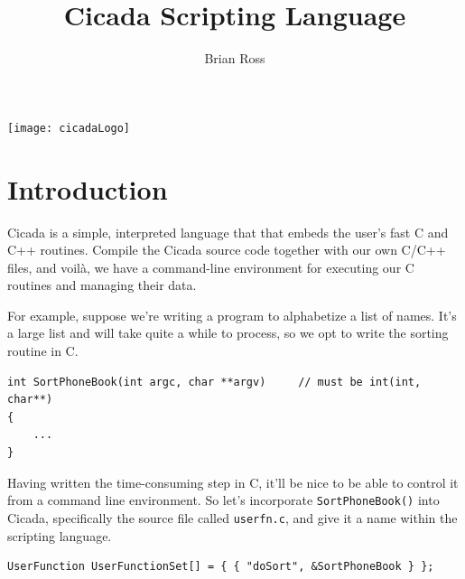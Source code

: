 \documentclass{article}
\title{Cicada Scripting Language}
\author{Brian Ross}
\newenvironment{code}{
       \begin{list}{}{
               \setlength{\leftmargin}{.4in}
               \setlength{\rightmargin}{0in}
               \setlength{\topsep}{.2in}
       }
       \small
       \item[] }
       { \end{list}   }
\begin{document}
\maketitle
\vspace{.5in}
\begin{centering}
\texttt{[image: cicadaLogo]}\\
\end{centering}
\vspace{.5in}
\tableofcontents
\vspace{1.5in}
\newpage





\section{Introduction}

Cicada is a simple, interpreted language that that embeds the user's fast C and C++ routines.  Compile the Cicada source code together with our own C/C++ files, and voil\`a, we have a command-line environment for executing our C routines and managing their data.

For example, suppose we're writing a program to alphabetize a list of names.  It's a large list and will take quite a while to process, so we opt to write the sorting routine in C.

\begin{code} \begin{verbatim}
int SortPhoneBook(int argc, char **argv)     // must be int(int, char**)
{
    ...
}
\end{verbatim} \end{code}
 
\noindent Having written the time-consuming step in C, it'll be nice to be able to control it from a command line environment.  So let's incorporate \verb#SortPhoneBook()# into Cicada, specifically the source file called \verb#userfn.c#, and give it a name within the scripting language.

\begin{code} \begin{verbatim}
UserFunction UserFunctionSet[] = { { "doSort", &SortPhoneBook } };
\end{verbatim} \end{code}
\end{document}
